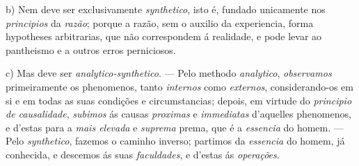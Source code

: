 b) Nem deve ser exclusivamente \emph{synthetico}, isto é, fundado unicamente nos \emph{principios} da \emph{razão}; porque a razão, sem o auxilio da experiencia, forma hypotheses arbitrarias, que não correspondem á realidade, e pode levar ao pantheismo e a outros erros perniciosos.

c) Mas deve ser \emph{analytico-synthetico}. --- Pelo methodo \emph{analytico}, \emph{observamos} primeiramente os phenomenos, tanto \emph{internos} como \emph{externos}, considerando-os em si e em todas as suas condições e circumstancias; depois, em virtude do \emph{principio de causalidade}, \emph{subimos} ás causas \emph{proximas} e \emph{immediatas} d'aquelles phenomenos, e d'estas para a \emph{mais elevada} e \emph{suprema}  prema, que é a \emph{essencia} do homem. --- Pelo \emph{synthetico}, fazemos o caminho inverso; partimos da \emph{essencia} do homem, já conhecida, e descemos ás suas \emph{faculdades}, e d'estas ás \emph{operações}.

